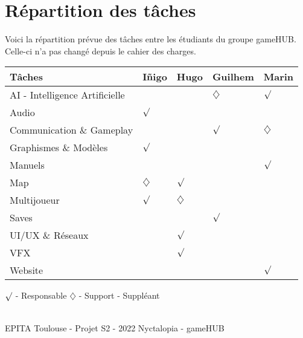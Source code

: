 \section{Répartition des tâches}
\noindent Voici la répartition prévue des tâches entre les étudiants du groupe gameHUB. Celle-ci n'a pas changé depuis le cahier des charges.


\begin{center}
\begin{tabular}{|l|l|l|l|l|}
\hline
Tâches                         & Iñigo & Hugo        & Guilhem & Marin \\ \hline
AI - Intelligence Artificielle &       &             & $\diamondsuit$        & $\surd$  \\ \hline
Audio                          & $\surd$  &             &         &       \\ \hline
Communication \& Gameplay                       &       &             & $\surd$    & $\diamondsuit$      \\ \hline
Graphismes \& Modèles          & $\surd$  &             &         &       \\ \hline
Manuels                        &       &             &         & $\surd$  \\ \hline
Map                            & $\diamondsuit$ & $\surd$        &         &       \\ \hline
Multijoueur                    & $\surd$  & $\diamondsuit$ &         &       \\ \hline
Saves                          &       &             & $\surd$    &       \\ \hline
UI/UX \& Réseaux             &       & $\surd$        &         &       \\ \hline
VFX                            &       & $\surd$        &         &       \\ \hline
Website                        &       &  &         & $\surd$  \\ \hline
\end{tabular}
\end{center}

\noindent $\surd$ - Responsable
\newline
$\diamondsuit$ - Support - Suppléant

\vfill
\noindent\makebox[\linewidth]{\rule{.8\paperwidth}{.6pt}}\\[0.2cm]
EPITA Toulouse - Projet S2 - 2022 \hfill Nyctalopia - gameHUB
\noindent\makebox[\linewidth]{\rule{.8\paperwidth}{.6pt}}